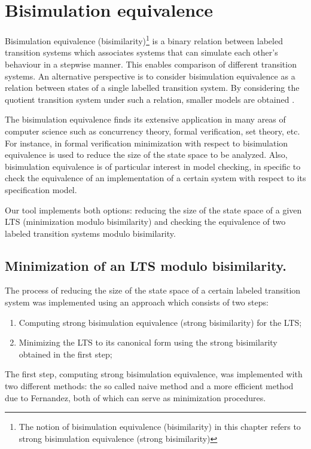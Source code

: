 \section{Bisimulation equivalence}
Bisimulation equivalence (bisimilarity)\footnote{The notion of bisimulation equivalence (bisimilarity) in this chapter 
refers to strong bisimulation equivalence (strong bisimilarity)} is a binary relation between labeled transition systems which associates systems that can simulate each other's behaviour in a stepwise manner. This enables comparison of different transition systems. An alternative perspective is to consider bisimulation equivalence as a relation between states of a single labelled transition system. By considering the quotient transition system under such a relation, smaller models are obtained \cite{ModelChecking}.

The bisimulation equivalence finds its extensive application in many areas of computer science such as concurrency theory, formal verification, set theory, etc. For instance, in formal verification minimization with respect to bisimulation equivalence is used to reduce the size of the state space to be analyzed. Also, bisimulation equivalence is of particular interest in model checking, in specific to check the equivalence of an implementation of a certain system with respect to its specification model.

Our tool implements both options: reducing the size of the state space of a given LTS (minimization modulo bisimilarity) and checking the equivalence of two labeled transition systems modulo bisimilarity.

\subsection{Minimization of an LTS modulo bisimilarity.}
The process of reducing the size of the state space of a certain labeled transition system was implemented using an approach which consists of two steps:
\begin{enumerate}
\item Computing strong bisimulation equivalence (strong bisimilarity) for the LTS;
\item Minimizing the LTS to its canonical form using the strong bisimilarity obtained in the first step;
\end{enumerate}

The first step, computing strong bisimulation equivalence, was implemented with two different methods: the so called
naive method and a more efficient method due to Fernandez, both of which can serve as minimization procedures.

